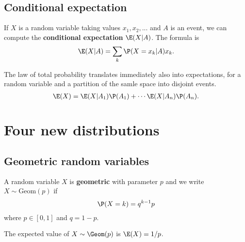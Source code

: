 \documentclass{article}
\begin{document}
\subsection{Conditional expectation}
\begin{definition}
	If $X$ is a random variable taking values $x_1, x_2, ...$ and $A$ is an event, we can
	compute the \textbf{conditional expectation} $\E(X|A)$. The formula is
	\begin{align*}
		\E(X|A) = \sum_k \P(X=x_k|A)x_k.
	\end{align*}
\end{definition}
\begin{proposition}
	The law of total probability translates immediately also into expectations, for a random
	variable and a partition of the samle space into disjoint events.
	\begin{align*}
		\E(X) = \E(X|A_1)\P(A_1)+\cdots\E(X|A_n)\P(A_n).
	\end{align*}
\end{proposition}
\section{Four new distributions}
\subsection{Geometric random variables}
\begin{definition}
	A random variable $X$ is \textbf{geometric} with parameter $p$ and we write $X\sim \text{Geom}(p)$ if
	\begin{align*}
		\P(X=k)=q^{k-1}p
	\end{align*}
	where $p\in[0,1]$ and $q=1-p$.
\end{definition}
\begin{proposition}
	The expected value of $X\sim\Geom(p)$ is $\E(X)=1/p$.
\end{proposition}
\end{document}
